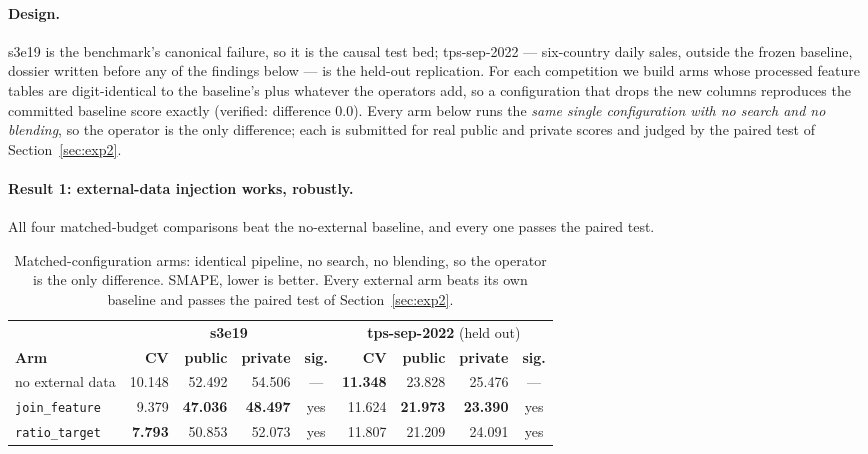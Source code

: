 \documentclass[11pt,a4paper]{article}
\begin{document}
\paragraph{Design.} s3e19 is the benchmark's canonical failure, so it is the causal test bed; tps-sep-2022 --- six-country daily sales, outside the frozen baseline, dossier written before any of the findings below --- is the held-out replication. For each competition we build arms whose processed feature tables are digit-identical to the baseline's plus whatever the operators add, so a configuration that drops the new columns reproduces the committed baseline score exactly (verified: difference 0.0). Every arm below runs the \emph{same single configuration with no search and no blending}, so the operator is the only difference; each is submitted for real public and private scores and judged by the paired test of Section~\ref{sec:exp2}.

\paragraph{Result 1: external-data injection works, robustly.} All four matched-budget comparisons beat the no-external baseline, and every one passes the paired test.

\begin{table}[H]
\centering\small
\caption{Matched-configuration arms: identical pipeline, no search, no blending, so the operator is the only difference. SMAPE, lower is better. Every external arm beats its own baseline and passes the paired test of Section~\ref{sec:exp2}.}
\label{tab:v5-2x2}
\setlength{\tabcolsep}{5pt}
\begin{tabular}{@{}lrrrcrrrc@{}}
\toprule
 & \multicolumn{4}{c}{\textbf{s3e19}} & \multicolumn{4}{c}{\textbf{tps-sep-2022} (held out)} \\
\cmidrule(lr){2-5}\cmidrule(lr){6-9}
\textbf{Arm} & \textbf{CV} & \textbf{public} & \textbf{private} & \textbf{sig.} & \textbf{CV} & \textbf{public} & \textbf{private} & \textbf{sig.} \\
\midrule
no external data & 10.148 & 52.492 & 54.506 & --- & \textbf{11.348} & 23.828 & 25.476 & --- \\
\texttt{join\_feature} & 9.379 & \textbf{47.036} & \textbf{48.497} & yes & 11.624 & \textbf{21.973} & \textbf{23.390} & yes \\
\texttt{ratio\_target} & \textbf{7.793} & 50.853 & 52.073 & yes & 11.807 & 21.209 & 24.091 & yes \\
\bottomrule
\end{tabular}
\end{table}
\end{document}
